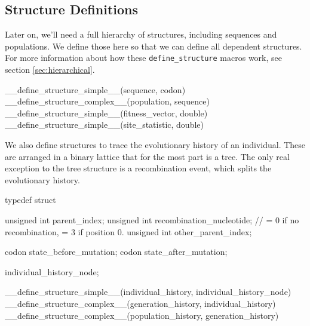 \documentclass{article}
\begin{document}

    \subsection{Structure Definitions}
      \label{sec:structure-definitions}

      Later on, we'll need a full hierarchy of structures, including sequences
      and populations. We define those here so that we can define all dependent
      structures. For more information about how these \verb|define_structure|
      macros work, see section \ref{sec:hierarchical}.

\begin{ccode}
__define_structure_simple__(sequence, codon)
__define_structure_complex__(population, sequence)
__define_structure_simple__(fitness_vector, double)
__define_structure_simple__(site_statistic, double)
\end{ccode}

      We also define structures to trace the evolutionary history of an
      individual. These are arranged in a binary lattice that for the most part
      is a tree. The only real exception to the tree structure is a
      recombination event, which splits the evolutionary history.

\begin{ccode}
typedef struct {
  unsigned int parent_index;
  unsigned int recombination_nucleotide;  // = 0 if no recombination, = 3 if position 0.
  unsigned int other_parent_index;

  codon	state_before_mutation;
  codon state_after_mutation;
} individual_history_node;

__define_structure_simple__(individual_history, individual_history_node)
__define_structure_complex__(generation_history, individual_history)
__define_structure_complex__(population_history, generation_history)
\end{ccode}
\end{document}
